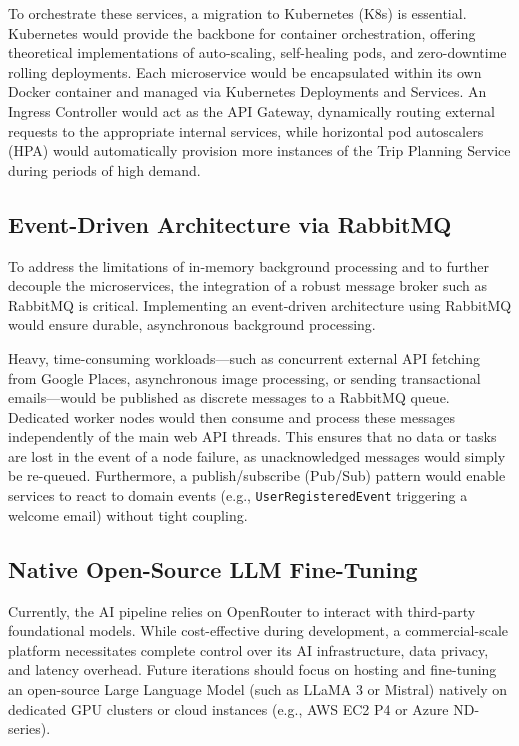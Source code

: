 To orchestrate these services, a migration to Kubernetes (K8s) is essential. Kubernetes would provide the backbone for container orchestration, offering theoretical implementations of auto-scaling, self-healing pods, and zero-downtime rolling deployments. Each microservice would be encapsulated within its own Docker container and managed via Kubernetes Deployments and Services. An Ingress Controller would act as the API Gateway, dynamically routing external requests to the appropriate internal services, while horizontal pod autoscalers (HPA) would automatically provision more instances of the Trip Planning Service during periods of high demand.

\subsection{Event-Driven Architecture via RabbitMQ}
To address the limitations of in-memory background processing and to further decouple the microservices, the integration of a robust message broker such as RabbitMQ is critical. Implementing an event-driven architecture using RabbitMQ would ensure durable, asynchronous background processing. 

Heavy, time-consuming workloads---such as concurrent external API fetching from Google Places, asynchronous image processing, or sending transactional emails---would be published as discrete messages to a RabbitMQ queue. Dedicated worker nodes would then consume and process these messages independently of the main web API threads. This ensures that no data or tasks are lost in the event of a node failure, as unacknowledged messages would simply be re-queued. Furthermore, a publish/subscribe (Pub/Sub) pattern would enable services to react to domain events (e.g., \texttt{UserRegisteredEvent} triggering a welcome email) without tight coupling.

\subsection{Native Open-Source LLM Fine-Tuning}
Currently, the AI pipeline relies on OpenRouter to interact with third-party foundational models. While cost-effective during development, a commercial-scale platform necessitates complete control over its AI infrastructure, data privacy, and latency overhead. Future iterations should focus on hosting and fine-tuning an open-source Large Language Model (such as LLaMA 3 or Mistral) natively on dedicated GPU clusters or cloud instances (e.g., AWS EC2 P4 or Azure ND-series).

